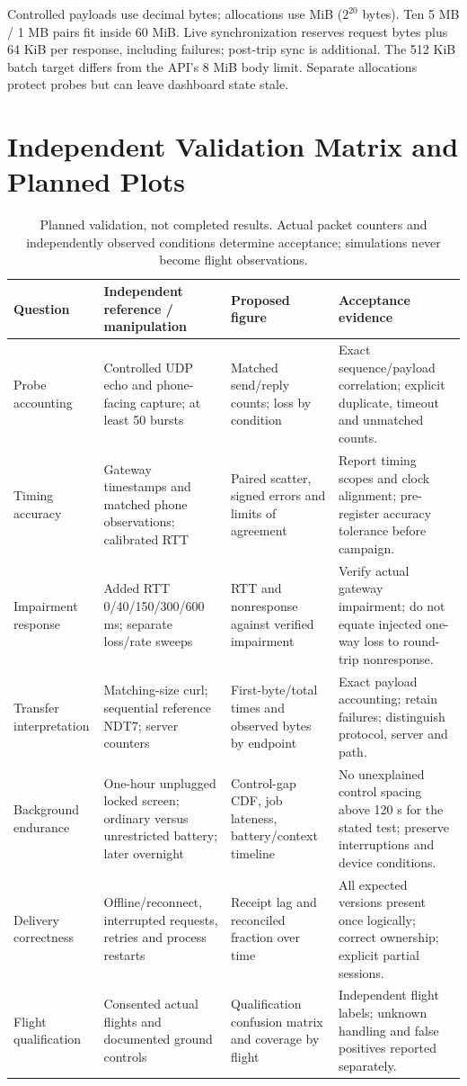 Controlled payloads use decimal bytes; allocations use MiB ($2^{20}$ bytes).
Ten 5 MB / 1 MB pairs fit inside 60 MiB. Live synchronization reserves request
bytes plus 64 KiB per response, including failures; post-trip sync is additional.
The 512 KiB batch target differs from the API's 8 MiB body limit. Separate
allocations protect probes but can leave dashboard state stale.

\section{Independent Validation Matrix and Planned Plots}
\label{app:validation}
\begin{table}[!htbp]
\centering\footnotesize
\caption{Planned validation, not completed results. Actual packet counters and
independently observed conditions determine acceptance; simulations never become
flight observations.}
\label{tab:plan}
\begin{tabularx}{\textwidth}{@{}p{}p{}p{}Y@{}}
\toprule
Question & Independent reference / manipulation & Proposed figure & Acceptance evidence\\
\midrule
Probe accounting & Controlled UDP echo and phone-facing capture; at least 50 bursts & Matched send/reply counts; loss by condition & Exact sequence/payload correlation; explicit duplicate, timeout and unmatched counts.\\
Timing accuracy & Gateway timestamps and matched phone observations; calibrated RTT & Paired scatter, signed errors and limits of agreement & Report timing scopes and clock alignment; pre-register accuracy tolerance before campaign.\\
Impairment response & Added RTT 0/40/150/300/600 ms; separate loss/rate sweeps & RTT and nonresponse against verified impairment & Verify actual gateway impairment; do not equate injected one-way loss to round-trip nonresponse.\\
Transfer interpretation & Matching-size curl; sequential reference NDT7; server counters & First-byte/total times and observed bytes by endpoint & Exact payload accounting; retain failures; distinguish protocol, server and path.\\
Background endurance & One-hour unplugged locked screen; ordinary versus unrestricted battery; later overnight & Control-gap CDF, job lateness, battery/context timeline & No unexplained control spacing above 120 s for the stated test; preserve interruptions and device conditions.\\
Delivery correctness & Offline/reconnect, interrupted requests, retries and process restarts & Receipt lag and reconciled fraction over time & All expected versions present once logically; correct ownership; explicit partial sessions.\\
Flight qualification & Consented actual flights and documented ground controls & Qualification confusion matrix and coverage by flight & Independent flight labels; unknown handling and false positives reported separately.\\
\bottomrule
\end{tabularx}
\end{table}

